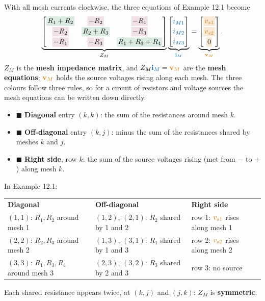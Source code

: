 \documentclass[11pt,a4paper]{article}
\newcommand{\Icol}[1]{\textcolor{ccur}{#1}}
\newcommand{\Vcol}[1]{\textcolor{cvolt}{#1}}
\newcommand{\cbx}[2]{{\setlength{\fboxsep}{1.6pt}\colorbox{#1}{$\displaystyle #2\mathstrut$}}}
\newcommand{\dg}[1]{\cbx{cpow!16}{#1}}
\newcommand{\od}[1]{\cbx{metured!13}{#1}}
\newcommand{\chip}[1]{\textcolor{#1}{$\blacksquare$}}
\newcommand{\im}[1]{\textcolor{ccur}{i_{M#1}}}
\begin{document}
With all mesh currents clockwise, the three equations of Example 12.1 become
\[
  \underbrace{\begin{bmatrix}
    \dg{R_1 + R_2} & \od{-R_2} & \od{-R_1}\\[2pt]
    \od{-R_2} & \dg{R_2 + R_3} & \od{-R_3}\\[2pt]
    \od{-R_1} & \od{-R_3} & \dg{R_1 + R_3 + R_4}
  \end{bmatrix}}_{Z_M}
  \underbrace{\begin{bmatrix} \im{1}\\[2pt] \im{2}\\[2pt] \im{3} \end{bmatrix}}_{\Icol{\mathbf{i}_M}}
  =
  \underbrace{\begin{bmatrix} \cbx{cvolt!16}{\Vcol{v_{s1}}}\\[2pt] \cbx{cvolt!16}{\Vcol{v_{s2}}}\\[2pt] \cbx{cvolt!16}{0} \end{bmatrix}}_{\Vcol{\mathbf{v}_M}} .
\]
$Z_M$ is the \textbf{mesh impedance matrix}, and $Z_M\Icol{\mathbf{i}_M} = \Vcol{\mathbf{v}_M}$
are the \textbf{mesh equations}; $\Vcol{\mathbf{v}_M}$ holds the source voltages rising along
each mesh. The three colours follow three rules, so for a circuit of resistors and voltage
sources the mesh equations can be written down directly.

\begin{ideabox}
\begin{itemize}
  \item \chip{cpow!45} \textbf{Diagonal} entry $(k,k)$: the sum of the resistances around mesh $k$.
  \item \chip{metured!50} \textbf{Off-diagonal} entry $(k,j)$: minus the sum of the resistances shared by meshes $k$ and $j$.
  \item \chip{cvolt!50} \textbf{Right side}, row $k$: the sum of the source voltages rising (met from $-$ to $+$) along mesh $k$.
\end{itemize}
In Example 12.1:
\par\smallskip
{\centering\small
\renewcommand{\arraystretch}{1.15}
\begin{tabular}{@{}lll@{}}
  \cellcolor{cpow!16}\textbf{Diagonal} & \cellcolor{metured!13}\textbf{Off-diagonal} & \cellcolor{cvolt!16}\textbf{Right side}\\
  $(1,1)$: $R_1, R_2$ around mesh 1 & $(1,2)$, $(2,1)$: $R_2$ shared by 1 and 2 & row 1: $\Vcol{v_{s1}}$ rises along mesh 1\\
  $(2,2)$: $R_2, R_3$ around mesh 2 & $(1,3)$, $(3,1)$: $R_1$ shared by 1 and 3 & row 2: $\Vcol{v_{s2}}$ rises along mesh 2\\
  $(3,3)$: $R_1, R_3, R_4$ around mesh 3 & $(2,3)$, $(3,2)$: $R_3$ shared by 2 and 3 & row 3: no source
\end{tabular}\par}
\smallskip
Each shared resistance appears twice, at $(k,j)$ and $(j,k)$: $Z_M$ is \textbf{symmetric}.
\end{ideabox}
\end{document}
